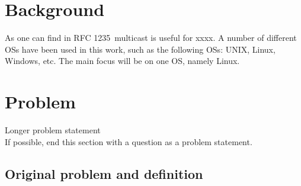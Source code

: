 

\section{Background}
\label{sec:background}


As one can find in RFC 1235\,\cite{ioannidis_coherent_1991} multicast is useful for xxxx. A number of different \glspl{OS} have been used in this work, such as the following \glspl{OS}: UNIX, Linux, Windows, etc. The main focus will be on one \gls{OS}, namely Linux.

\section{Problem}
\label{sec:problem}


Longer problem statement\\
If possible, end this section with a question as a problem statement.

\subsection{Original problem and definition}
\label{sec:researchQuestion}


